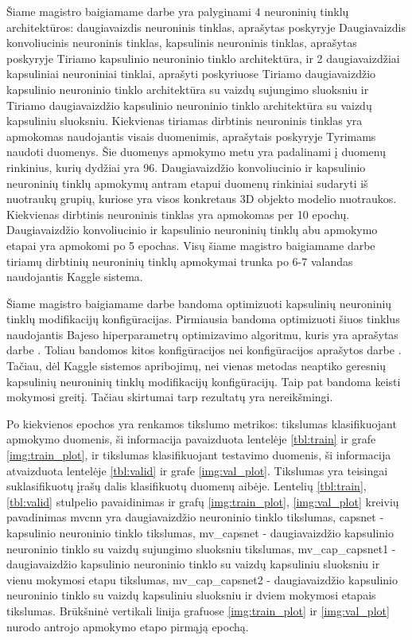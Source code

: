 
Šiame magistro baigiamame darbe yra palyginami 4 neuroninių tinklų architektūros: daugiavaizdis neuroninis tinklas, aprašytas poskyryje Daugiavaizdis konvoliucinis neuroninis tinklas, kapsulinis neuroninis tinklas, aprašytas poskyryje Tiriamo kapsulinio neuroninio tinklo architektūra, ir 2 daugiavaizdžiai kapsuliniai neuroniniai tinklai, aprašyti poskyriuose Tiriamo daugiavaizdžio kapsulinio neuroninio tinklo architektūra su vaizdų sujungimo sluoksniu ir Tiriamo daugiavaizdžio kapsulinio neuroninio tinklo architektūra su vaizdų kapsuliniu sluoksniu. Kiekvienas tiriamas dirbtinis neuroninis tinklas yra apmokomas naudojantis visais duomenimis, aprašytais poskyryje Tyrimams naudoti duomenys. Šie duomenys apmokymo metu yra padalinami į duomenų rinkinius, kurių dydžiai yra 96. Daugiavaizdžio konvoliucinio ir kapsulinio neuroninių tinklų apmokymų antram etapui duomenų rinkiniai sudaryti iš nuotraukų grupių, kuriose yra visos konkretaus 3D objekto modelio nuotraukos. Kiekvienas dirbtinis neuroninis tinklas yra apmokomas per 10 epochų. Daugiavaizdžio konvoliucinio ir kapsulinio neuroninių tinklų abu apmokymo etapai yra apmokomi po 5 epochas. Visų šiame magistro baigiamame darbe tiriamų dirbtinių neuroninių tinklų apmokymai trunka po 6-7 valandas naudojantis Kaggle sistema.

Šiame magistro baigiamame darbe bandoma optimizuoti kapsulinių neuroninių tinklų modifikacijų konfigūracijas. Pirmiausia bandoma optimizuoti šiuos tinklus naudojantis Bajeso hiperparametrų optimizavimo algoritmu, kuris yra aprašytas darbe \cite{bayes}. Toliau bandomos kitos konfigūracijos nei konfigūracijos aprašytos darbe \cite{capsNet}. Tačiau, dėl Kaggle sistemos apribojimų, nei vienas metodas neaptiko geresnių kapsulinių neuroninių tinklų modifikacijų konfigūracijų. Taip pat bandoma 
keisti mokymosi greitį. Tačiau skirtumai tarp rezultatų yra nereikšmingi.

Po kiekvienos epochos yra renkamos tikslumo metrikos: tikslumas klasifikuojant apmokymo duomenis, ši informacija pavaizduota lentelėje \ref{tbl:train} ir grafe \ref{img:train_plot}, ir tikslumas klasifikuojant testavimo duomenis, ši informacija atvaizduota lentelėje \ref{tbl:valid} ir grafe \ref{img:val_plot}. Tikslumas yra teisingai suklasifikuotų įrašų dalis klasifikuotų duomenų aibėje. Lentelių \ref{tbl:train}, \ref{tbl:valid} stulpelio pavaidinimas ir grafų \ref{img:train_plot}, \ref{img:val_plot} kreivių pavadinimas mvcnn yra daugiavaizdžio neuroninio tinklo tikslumas, capsnet - kapsulinio neuroninio tinklo tikslumas, mv\_capsnet - daugiavaizdžio kapsulinio neuroninio tinklo su vaizdų sujungimo sluoksniu tikslumas, mv\_cap\_capsnet1 - daugiavaizdžio kapsulinio neuroninio tinklo su vaizdų kapsuliniu sluoksniu ir vienu mokymosi etapu tikslumas, mv\_cap\_capsnet2 - daugiavaizdžio kapsulinio neuroninio tinklo su vaizdų kapsuliniu sluoksniu ir dviem mokymosi etapais tikslumas. Brūkšninė vertikali linija grafuose \ref{img:train_plot} ir \ref{img:val_plot} nurodo antrojo apmokymo etapo pirmąją epochą.

